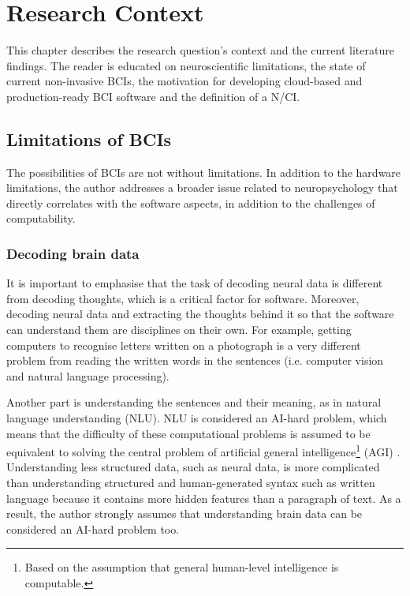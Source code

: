 \chapter{Research Context}
\graphicspath{{Chapter2/Figs/}{Chapter2/Figs/}}

This chapter describes the research question's context and the current literature findings. The reader is educated on neuroscientific limitations, the state of current non-invasive BCIs, the motivation for developing cloud-based and production-ready BCI software and the definition of a N/CI.

\section{Limitations of BCIs}
\label{chapter2-limitations-of-bcis}

The possibilities of BCIs are not without limitations. In addition to the hardware limitations, the author addresses a broader issue related to neuropsychology that directly correlates with the software aspects, in addition to the challenges of computability.

\subsection{Decoding brain data}
\label{chapter2-decoding-brain-data}

It is important to emphasise that the task of decoding neural data is different from decoding thoughts, which is a critical factor for software. Moreover, decoding neural data and extracting the thoughts behind it so that the software can understand them are disciplines on their own. For example, getting computers to recognise letters written on a photograph is a very different problem from reading the written words in the sentences (i.e. computer vision and natural language processing).

Another part is understanding the sentences and their meaning, as in natural language understanding (NLU). NLU is considered an AI-hard problem, which means that the difficulty of these computational problems is assumed to be equivalent to solving the central problem of artificial general intelligence\footnote{Based on the assumption that general human-level intelligence is computable.} (AGI) \citep{demasi_theoretical_2010}. Understanding less structured data, such as neural data, is more complicated than understanding structured and human-generated syntax such as written language because it contains more hidden features than a paragraph of text. As a result, the author strongly assumes that understanding brain data can be considered an AI-hard problem too.

